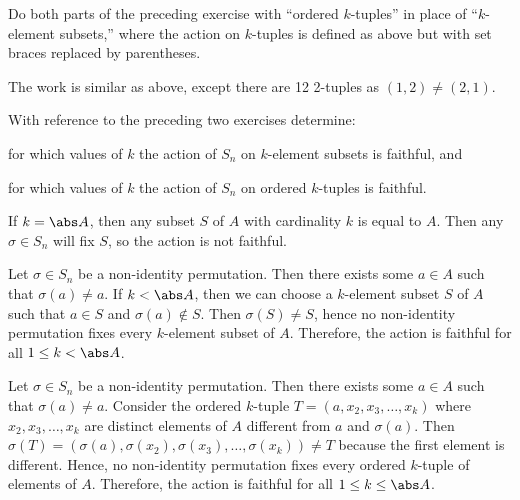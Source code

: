 \begin{exercise}\label{ex1.7.9}
    Do both parts of the preceding exercise with ``ordered $k$-tuples'' in place of ``$k$-element subsets,'' where the action on $k$-tuples is defined as above but with set braces replaced by parentheses.
    
\end{exercise}

\begin{sol}
    The work is similar as above, except there are 12 2-tuples as $(1, 2) \neq (2, 1)$.
\end{sol}

\begin{exercise}\label{ex1.7.10}
    With reference to the preceding two exercises determine:
    \begin{subproblems}
        \item for which values of $k$ the action of $S_n$ on $k$-element subsets is faithful, and
        \item for which values of $k$ the action of $S_n$ on ordered $k$-tuples is faithful.
    \end{subproblems}
\end{exercise}

\begin{solalph}
    \item If $k = \abs A$, then any subset $S$ of $A$ with cardinality $k$ is equal to $A$. Then any $\sigma \in S_n$ will fix $S$, so the action is not faithful.
    
    Let $\sigma \in S_n$ be a non-identity permutation. Then there exists some $a \in A$ such that $\sigma(a) \neq a$. If $k < \abs A$, then we can choose a $k$-element subset $S$ of $A$ such that $a \in S$ and $\sigma(a) \notin S$. Then $\sigma(S) \neq S$, hence no non-identity permutation fixes every $k$-element subset of $A$. Therefore, the action is faithful for all $1 \leq k < \abs A$.
    \item Let $\sigma \in S_n$ be a non-identity permutation. Then there exists some $a \in A$ such that $\sigma(a) \neq a$. Consider the ordered $k$-tuple $T = (a, x_2, x_3, \ldots, x_k)$ where $x_2, x_3, \ldots, x_k$ are distinct elements of $A$ different from $a$ and $\sigma(a)$. Then $\sigma(T) = (\sigma(a), \sigma(x_2), \sigma(x_3), \ldots, \sigma(x_k)) \neq T$ because the first element is different. Hence, no non-identity permutation fixes every ordered $k$-tuple of elements of $A$. Therefore, the action is faithful for all $1 \leq k \leq \abs A$.
\end{solalph}

